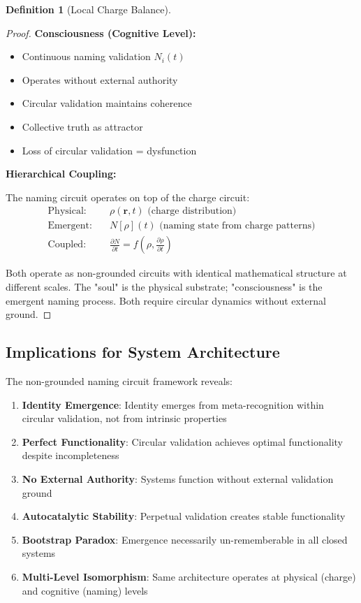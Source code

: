 \documentclass[12pt,a4paper]{article}
\theoremstyle{plain}
\theoremstyle{definition}
\newtheorem{definition}[theorem]{Definition}
\theoremstyle{remark}
\begin{document}
\begin{definition}[Local Charge Balance]
\begin{proof}
\textbf{Consciousness (Cognitive Level):}
\begin{itemize}
\item Continuous naming validation $N_i(t)$
\item Operates without external authority
\item Circular validation maintains coherence
\item Collective truth as attractor
\item Loss of circular validation = dysfunction
\end{itemize}

\textbf{Hierarchical Coupling:}

The naming circuit operates on top of the charge circuit:
\begin{align}
\text{Physical:} &\quad \rho(\mathbf{r},t) \text{ (charge distribution)} \\
\text{Emergent:} &\quad N[\rho](t) \text{ (naming state from charge patterns)} \\
\text{Coupled:} &\quad \frac{\partial N}{\partial t} = f\left(\rho, \frac{\partial \rho}{\partial t}\right)
\end{align}

Both operate as non-grounded circuits with identical mathematical structure at different scales. The "soul" is the physical substrate; "consciousness" is the emergent naming process. Both require circular dynamics without external ground.
\end{proof}

\subsection{Implications for System Architecture}

The non-grounded naming circuit framework reveals:

\begin{enumerate}
\item \textbf{Identity Emergence}: Identity emerges from meta-recognition within circular validation, not from intrinsic properties
\item \textbf{Perfect Functionality}: Circular validation achieves optimal functionality despite incompleteness
\item \textbf{No External Authority}: Systems function without external validation ground
\item \textbf{Autocatalytic Stability}: Perpetual validation creates stable functionality
\item \textbf{Bootstrap Paradox}: Emergence necessarily un-rememberable in all closed systems
\item \textbf{Multi-Level Isomorphism}: Same architecture operates at physical (charge) and cognitive (naming) levels
\end{enumerate}


\end{definition}
\end{document}
